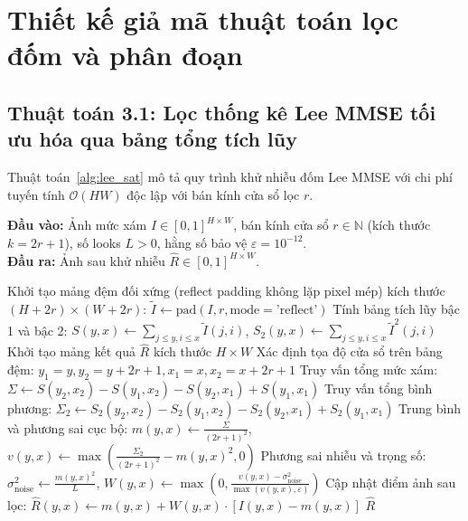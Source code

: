 \section{Thiết kế giả mã thuật toán lọc đốm và phân đoạn}
\label{sec:thuat_toan_loc_phan_nguong}

\subsection{Thuật toán 3.1: Lọc thống kê Lee MMSE tối ưu hóa qua bảng tổng tích lũy}

Thuật toán~\ref{alg:lee_sat} mô tả quy trình khử nhiễu đốm Lee MMSE với chi phí tuyến tính $\mathcal{O}(HW)$ độc lập với bán kính cửa sổ lọc $r$.

\begin{algorithm}[!htbp]
\small{}
\caption{Bộ lọc thống kê Lee MMSE tối ưu hóa qua bảng tổng tích lũy}
\label{alg:lee_sat}
\textbf{Đầu vào:} Ảnh mức xám $I \in [0, 1]^{H \times W}$, bán kính cửa sổ $r \in \mathbb{N}$ (kích thước $k = 2r+1$), số looks $L > 0$, hằng số bảo vệ $\varepsilon = 10^{-12}$. \\
\textbf{Đầu ra:} Ảnh sau khử nhiễu $\hat{R} \in [0, 1]^{H \times W}$.
\begin{algorithmic}[1]
\STATE Khởi tạo mảng đệm đối xứng (reflect padding không lặp pixel mép) kích thước $(H+2r) \times (W+2r)$: $\tilde{I} \leftarrow \text{pad}(I, r, \text{mode}=\text{'reflect'})$
\STATE Tính bảng tích lũy bậc 1 và bậc 2: $S(y, x) \leftarrow \sum_{j \le y, i \le x} \tilde{I}(j, i)$, $S_2(y, x) \leftarrow \sum_{j \le y, i \le x} \tilde{I}^2(j, i)$
\STATE Khởi tạo mảng kết quả $\hat{R}$ kích thước $H \times W$
    \STATE Xác định tọa độ cửa sổ trên bảng đệm: $y_1 = y, y_2 = y + 2r + 1, x_1 = x, x_2 = x + 2r + 1$
    \STATE Truy vấn tổng mức xám: $\Sigma \leftarrow S(y_2, x_2) - S(y_1, x_2) - S(y_2, x_1) + S(y_1, x_1)$
    \STATE Truy vấn tổng bình phương: $\Sigma_2 \leftarrow S_2(y_2, x_2) - S_2(y_1, x_2) - S_2(y_2, x_1) + S_2(y_1, x_1)$
    \STATE Trung bình và phương sai cục bộ: $m(y, x) \leftarrow \frac{\Sigma}{(2r+1)^2}$, $v(y, x) \leftarrow \max\left( \frac{\Sigma_2}{(2r+1)^2} - m(y, x)^2, 0 \right)$
    \STATE Phương sai nhiễu và trọng số: $\sigma_{\text{noise}}^2 \leftarrow \frac{m(y, x)^2}{L}$, $W(y, x) \leftarrow \max\left(0, \frac{v(y, x) - \sigma_{\text{noise}}^2}{\max(v(y, x), \varepsilon)}\right)$
    \STATE Cập nhật điểm ảnh sau lọc: $\hat{R}(y, x) \leftarrow m(y, x) + W(y, x) \cdot [I(y, x) - m(y, x)]$
\ENDFOR
\RETURN $\hat{R}$
\end{algorithmic}
\end{algorithm}

